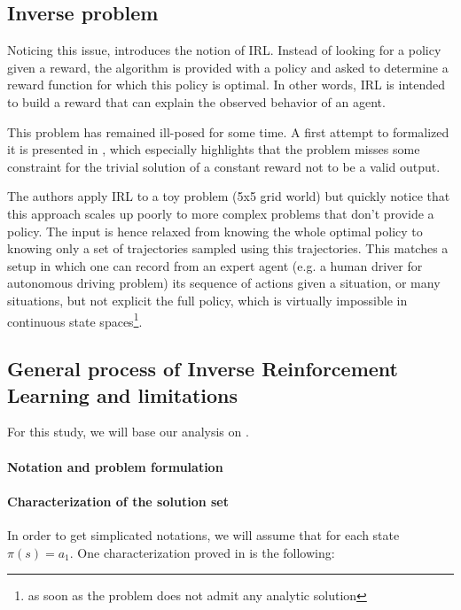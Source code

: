 \documentclass{article}
\begin{document}
\subsection{Inverse problem}

Noticing this issue, \cite{Russell98} introduces the notion of IRL. Instead of looking for a policy given a reward, the algorithm is provided with a policy and asked to determine a reward function for which this policy is optimal. In other words, IRL is intended to build a reward that can explain the observed behavior of an agent.

This problem has remained ill-posed for some time. A first attempt to formalized it is presented in \cite{Ng00}, which especially highlights that the problem misses some constraint for the trivial solution of a constant reward not to be a valid output.

The authors apply IRL to a toy problem (5x5 grid world) but quickly notice that this approach scales up poorly to more complex problems that don't provide a policy. The input is hence relaxed from knowing the whole optimal policy to knowing only a set of trajectories sampled using this trajectories. This matches a setup in which one can record from an expert agent (e.g. a human driver for autonomous driving problem) its sequence of actions given a situation, or many situations, but not explicit the full policy, which is virtually impossible in continuous state spaces\footnote{as soon as the problem does not admit any analytic solution}.


\subsection{General process of Inverse Reinforcement Learning and limitations}

For this study, we will base our analysis on \cite{Ng00}.

\paragraph{Notation and problem formulation}

\paragraph{Characterization of the solution set}

In order to get simplicated notations, we will assume that for each state $\pi( s) = a_{1} $. 
One characterization proved in \cite{Ng00} is the following:
\end{document}
